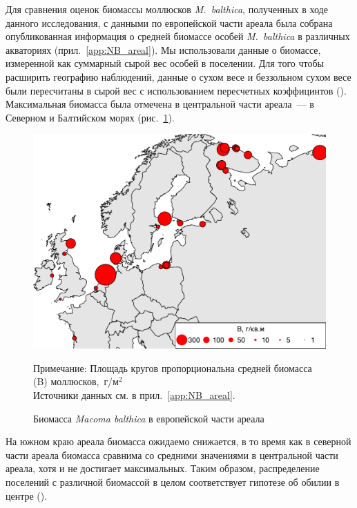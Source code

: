Для сравнения оценок биомассы моллюсков {\it M.~balthica}, полученных в ходе данного исследования, с данными по европейской части ареала была собрана опубликованная информация о средней биомассе особей {\it M.~balthica} в различных акваториях (прил.~\ref{app:NB_areal}).
Мы использовали данные о биомассе, измеренной как суммарный сырой вес особей в поселении.
Для того чтобы расширить географию наблюдений, данные о сухом весе и беззольном сухом весе были пересчитаны в сырой вес с использованием пересчетных коэффицинтов (\cite{Ricciardi_Bourget_1998}).
Максимальная биомасса была отмечена в центральной части ареала~--- в Северном и Балтийском морях (рис.~\ref{ris:B_macrodistribution}).
	\begin{figure}[p]
    \includegraphics[width=\textwidth]{../macrodistribution/Bmean_ru1.pdf}
    \caption{Биомасса {\it Macoma balthica} в европейской части ареала}

{\footnotesize Примечание: Площадь кругов пропорциональна средней биомасса (B) моллюсков,~г/м$^2$ \\
Источники данных см. в прил.~\ref{app:NB_areal}.}
    \label{ris:B_macrodistribution}
	\end{figure}
На южном краю ареала биомасса ожидаемо снижается, в то время как в северной части ареала биомасса сравнима со средними значениями в центральной части ареала, хотя и не достигает максимальных.
Таким образом, распределение поселений с различной биомассой в целом соответствует гипотезе об обилии в центре (\cite{Sagarin_Gaines_2002}).


\afterpage{\clearpage}

